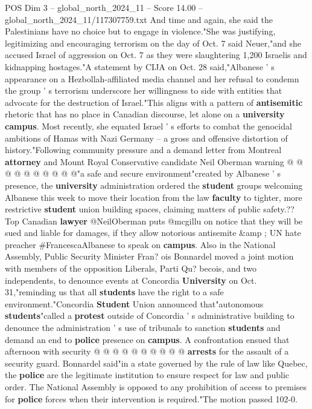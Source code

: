 \begin{textsample}{POS Dim 3 – global\_north\_2024\_11 – Score 14.00 – global\_north\_2024\_11/117307759.txt}
And time and again, she said the Palestinians have no choice but to engage in violence."She was justifying, legitimizing and encouraging terrorism on the day of Oct. 7 said Neuer,"and she accused Israel of aggression on Oct. 7 as they were slaughtering 1,200 Israelis and kidnapping hostages."A statement by CIJA on Oct. 28 said,"Albanese ' s appearance on a Hezbollah-affiliated media channel and her refusal to condemn the group ' s terrorism underscore her willingness to side with entities that advocate for the destruction of Israel."This aligns with a pattern of \textbf{antisemitic} rhetoric that has no place in Canadian discourse, let alone on a \textbf{university} \textbf{campus}.
Most recently, she equated Israel ' s efforts to combat the genocidal ambitions of Hamas with Nazi Germany -- a gross and offensive distortion of history."Following community pressure and a demand letter from Montreal \textbf{attorney} and Mount Royal Conservative candidate Neil Oberman warning @ @ @ @ @ @ @ @ @ @"a safe and secure environment"created by Albanese ' s presence, the \textbf{university} administration ordered the \textbf{student} groups welcoming Albanese this week to move their location from the law \textbf{faculty} to tighter, more restrictive \textbf{student} union building spaces, claiming matters of public safety.??
Top Canadian \textbf{lawyer} @NeilOberman puts @mcgillu on notice that they will be sued and liable for damages, if they allow notorious antisemite \&amp ; UN hate preacher \#FrancescaAlbanese to speak on \textbf{campus}.
Also in the National Assembly, Public Security Minister Fran? ois Bonnardel moved a joint motion with members of the opposition Liberals, Parti Qu? becois, and two independents, to denounce events at Concordia \textbf{University} on Oct. 31,"reminding us that all \textbf{students} have the right to a safe environment."Concordia \textbf{Student} Union announced that"autonomous \textbf{students}"called a \textbf{protest} outside of Concordia ' s administrative building to denounce the administration ' s use of tribunals to sanction \textbf{students} and demand an end to \textbf{police} presence on \textbf{campus}.
A confrontation ensued that afternoon with security @ @ @ @ @ @ @ @ @ @ \textbf{arrests} for the assault of a security guard.
Bonnardel said"in a state governed by the rule of law like Quebec, the \textbf{police} are the legitimate institution to ensure respect for law and public order.
The National Assembly is opposed to any prohibition of access to premises for \textbf{police} forces when their intervention is required."The motion passed 102-0.

\end{textsample}
